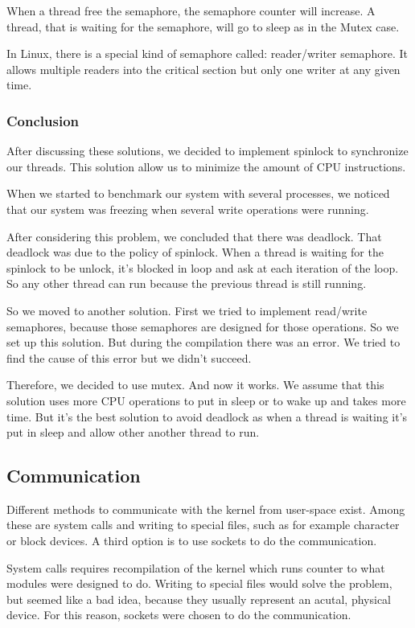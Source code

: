 \documentclass[final,a4paper]{article}
\begin{document}
When a thread free the semaphore, the semaphore counter will increase.
A thread, that is waiting for the semaphore, will go to sleep as in the Mutex
case.

In Linux, there is a special kind of semaphore called: reader/writer semaphore.
It allows multiple readers into the critical section but only one writer at any
given time.

\subsubsection*{Conclusion}
After discussing these solutions, we decided to implement spinlock to
synchronize our threads. This solution allow us to minimize the amount of CPU
instructions.

When we started to benchmark our system with several processes, we noticed that
our system was freezing when several write operations were running.

After considering this problem, we concluded that there was deadlock. That
deadlock was due to the policy of spinlock. When a thread is waiting for the
spinlock to be unlock, it’s blocked in loop and ask at each iteration of the
loop. So any other thread can run because the previous thread is still running.

So we moved to another solution. First we tried to implement read/write
semaphores, because those semaphores are designed for those operations. So we
set up this solution. But during the compilation there was an error. We tried
to find the cause of this error but we didn’t succeed.

Therefore, we decided to use mutex. And now it works. We assume that this
solution uses more CPU operations to put in sleep or to wake up and takes more
time. But it’s the best solution to avoid deadlock as when a thread is waiting
it’s put in sleep and allow other another thread to run.

\subsection{Communication}
Different methods to communicate with the kernel from user-space exist. Among
these are system calls and writing to special files, such as for example
character or block devices. A third option is to use sockets to do the
communication.

System calls requires recompilation of the kernel which runs counter to what
modules were designed to do. Writing to special files would solve the problem,
but seemed like a bad idea, because they usually represent an acutal, physical
device. For this reason, sockets were chosen to do the communication.
\end{document}
